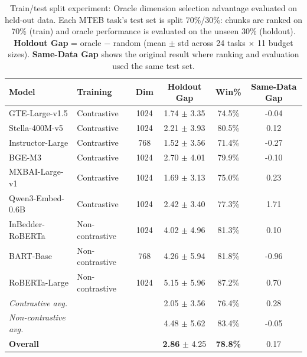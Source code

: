 \begin{table}[t]
\centering
\small
\caption{Train/test split experiment: Oracle dimension selection advantage evaluated on held-out data. Each MTEB task's test set is split 70\%/30\%: chunks are ranked on 70\% (train) and oracle performance is evaluated on the unseen 30\% (holdout). \textbf{Holdout Gap} = oracle $-$ random (mean $\pm$ std across 24 tasks $\times$ 11 budget sizes). \textbf{Same-Data Gap} shows the original result where ranking and evaluation used the same test set.}
\label{tab:train_test_split}
\begin{tabular}{@{}llcccc@{}}
\toprule
\textbf{Model} & \textbf{Training} & \textbf{Dim} & \textbf{Holdout Gap} & \textbf{Win\%} & \textbf{Same-Data Gap} \\
\midrule
GTE-Large-v1.5 & Contrastive & 1024 & 1.74 $\pm$ 3.35 & 74.5\% & -0.04 \\
Stella-400M-v5 & Contrastive & 1024 & 2.21 $\pm$ 3.93 & 80.5\% & 0.12 \\
Instructor-Large & Contrastive & 768 & 1.52 $\pm$ 3.56 & 71.4\% & -0.27 \\
BGE-M3 & Contrastive & 1024 & 2.70 $\pm$ 4.01 & 79.9\% & -0.10 \\
MXBAI-Large-v1 & Contrastive & 1024 & 1.69 $\pm$ 3.13 & 75.0\% & 0.23 \\
Qwen3-Embed-0.6B & Contrastive & 1024 & 2.42 $\pm$ 3.40 & 77.3\% & 1.71 \\
\midrule
InBedder-RoBERTa & Non-contrastive & 1024 & 4.02 $\pm$ 4.96 & 81.3\% & 0.10 \\
BART-Base & Non-contrastive & 768 & 4.26 $\pm$ 5.94 & 81.8\% & -0.96 \\
RoBERTa-Large & Non-contrastive & 1024 & 5.15 $\pm$ 5.96 & 87.2\% & 0.70 \\
\midrule
\textit{Contrastive avg.} & & & 2.05 $\pm$ 3.56 & 76.4\% & 0.28 \\
\textit{Non-contrastive avg.} & & & 4.48 $\pm$ 5.62 & 83.4\% & -0.05 \\
\midrule
\textbf{Overall} & & & \textbf{2.86} $\pm$ 4.25 & \textbf{78.8\%} & 0.17 \\
\bottomrule
\end{tabular}
\end{table}
